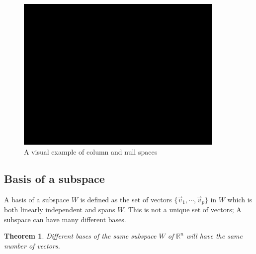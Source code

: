 \documentclass[11pt, a4paper]{article}
\newtheorem{theorem}{Theorem}
\begin{document}
\begin{figure}[h] %
  \centerline{\includegraphics[width=10cm]{images/placeholder.png}}
  \caption{A visual example of column and null spaces}
\end{figure}


\subsection{Basis of a subspace}
A basis of a subspace $W$ is defined as the set of vectors $\{ \vec{v}_1, \cdots, \vec{v}_p \}$ in $W$ which
is both linearly independent and spans $W$. This is not a unique set of vectors; A subspace can have
many different bases.

\begin{theorem}
  Different bases of the same subspace $W$ of $\mathbb{R}^n$ will have the same number of vectors.
\end{theorem}
\end{document}

